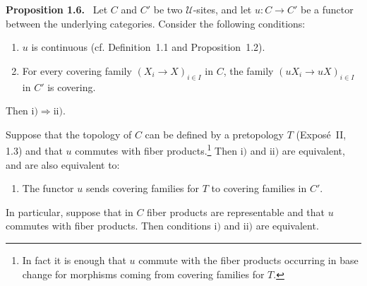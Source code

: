 \documentclass[11pt]{article}
\newcommand{\U}{\mathcal{U}}
\newenvironment{statement}[1]{\par\medskip\noindent\textbf{#1.}\ }{\par\medskip}
\begin{document}
\begin{statement}{Proposition 1.6}
Let \(C\) and \(C'\) be two \(\U\)-sites, and let \(u:C\to C'\) be a functor between the underlying categories. Consider the following conditions:
\begin{enumerate}[label=\roman*)]
\item \(u\) is continuous (cf. Definition~1.1 and Proposition~1.2).
\item For every covering family \((X_i\to X)_{i\in I}\) in \(C\), the family \((uX_i\to uX)_{i\in I}\) in \(C'\) is covering.
\end{enumerate}
Then \(\mathrm{i})\Rightarrow\mathrm{ii})\).

Suppose that the topology of \(C\) can be defined by a pretopology \(T\) (Expos\'e~II, 1.3) and that \(u\) commutes with fiber products.\footnote{In fact it is enough that \(u\) commute with the fiber products occurring in base change for morphisms coming from covering families for \(T\).} Then \(\mathrm{i})\) and \(\mathrm{ii})\) are equivalent, and are also equivalent to:
\begin{enumerate}[label=\roman*),resume]
\item The functor \(u\) sends covering families for \(T\) to covering families in \(C'\).
\end{enumerate}
In particular, suppose that in \(C\) fiber products are representable and that \(u\) commutes with fiber products. Then conditions \(\mathrm{i})\) and \(\mathrm{ii})\) are equivalent.
\end{statement}
\end{document}
